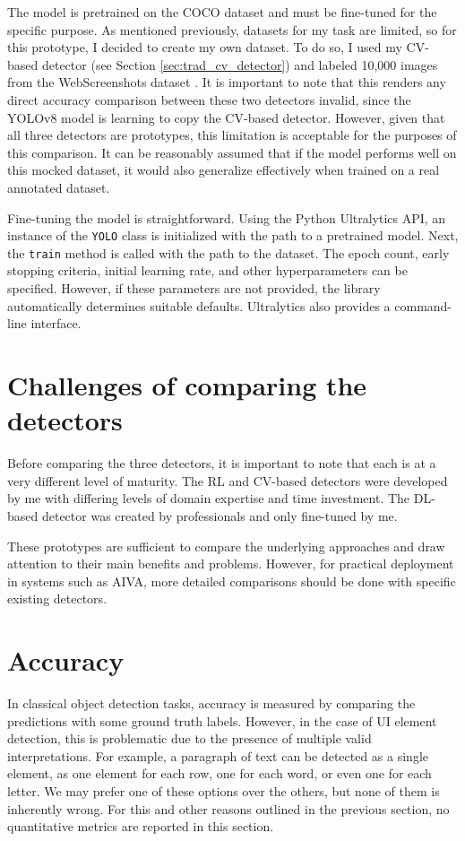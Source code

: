 \documentclass[
  digital,     %
  oneside,     %
  nosansbold,  %
  nocolorbold, %
  lof,         %
  lot,         %
]{fithesis4}
\begin{document}
The model is pretrained on the COCO dataset \cite{COCO} and must be fine-tuned for the specific purpose. As mentioned previously, datasets for my task are limited, so for this prototype, I decided to create my own dataset. To do so, I used my CV-based detector (see Section \ref{sec:trad_cv_detector}) and labeled 10,000 images from the WebScreenshots dataset \cite{aydos2020}. It is important to note that this renders any direct accuracy comparison between these two detectors invalid, since the YOLOv8 model is learning to copy the CV-based detector. However, given that all three detectors are prototypes, this limitation is acceptable for the purposes of this comparison. It can be reasonably assumed that if the model performs well on this mocked dataset, it would also generalize effectively when trained on a real annotated dataset.

Fine-tuning the model is straightforward. Using the Python Ultralytics API, an instance of the \texttt{YOLO} class is initialized with the path to a pretrained model. Next, the \texttt{train} method is called with the path to the dataset. The epoch count, early stopping criteria, initial learning rate, and other hyperparameters can be specified. However, if these parameters are not provided, the library automatically determines suitable defaults. Ultralytics also provides a command-line interface.

\section{Challenges of comparing the detectors}

Before comparing the three detectors, it is important to note that each is at a very different level of maturity. The RL and CV-based detectors were developed by me with differing levels of domain expertise and time investment. The DL-based detector was created by professionals and only fine-tuned by me.

These prototypes are sufficient to compare the underlying approaches and draw attention to their main benefits and problems. However, for practical deployment in systems such as AIVA, more detailed comparisons should be done with specific existing detectors.

\section{Accuracy}

In classical object detection tasks, accuracy is measured by comparing the predictions with some ground truth labels. However, in the case of UI element detection, this is problematic due to the presence of multiple valid interpretations. For example, a paragraph of text can be detected as a single element, as one element for each row, one for each word, or even one for each letter. We may prefer one of these options over the others, but none of them is inherently wrong. For this and other reasons outlined in the previous section, no quantitative metrics are reported in this section.
\end{document}
